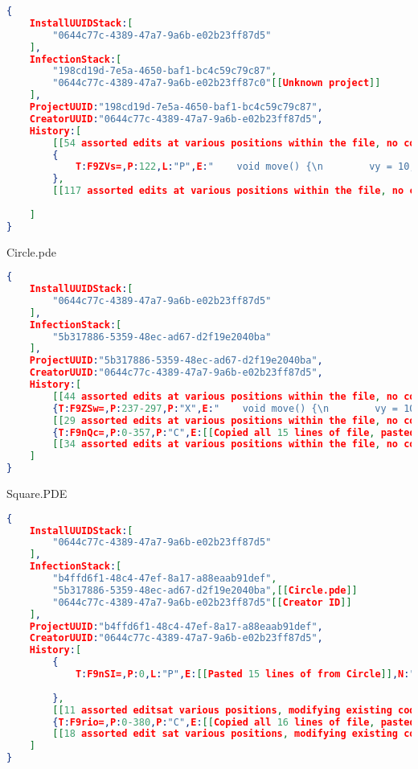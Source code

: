 \documentclass[conference]{IEEEtran}
\newcommand{\n}{\hfill\break}
\begin{document}
\begin{lstlisting}[language=json]
{
	InstallUUIDStack:[
		"0644c77c-4389-47a7-9a6b-e02b23ff87d5"
	],
	InfectionStack:[
		"198cd19d-7e5a-4650-baf1-bc4c59c79c87",
		"0644c77c-4389-47a7-9a6b-e02b23ff87c0"[[Unknown project]]
	],
	ProjectUUID:"198cd19d-7e5a-4650-baf1-bc4c59c79c87",
	CreatorUUID:"0644c77c-4389-47a7-9a6b-e02b23ff87d5",
	History:[
		[[54 assorted edits at various positions within the file, no copies or pastes]]
		{
			T:F9ZVs=,P:122,L:"P",E:"    void move() {\n        vy = 10;\n        y = y + vy;\n    }",N:"Paste too short to track"[[Came from a Cut in Circle]]
		},
		[[117 assorted edits at various positions within the file, no copies or pastes]]
		
	]
}
\end{lstlisting}
Circle.pde
\begin{lstlisting}[language=json]
{
	InstallUUIDStack:[
		"0644c77c-4389-47a7-9a6b-e02b23ff87d5"
	],
	InfectionStack:[
		"5b317886-5359-48ec-ad67-d2f19e2040ba"
	],
	ProjectUUID:"5b317886-5359-48ec-ad67-d2f19e2040ba",
	CreatorUUID:"0644c77c-4389-47a7-9a6b-e02b23ff87d5",
	History:[
		[[44 assorted edits at various positions within the file, no copies or pastes]]
		{T:F9ZSw=,P:237-297,P:"X",E:"    void move() {\n        vy = 10;\n        y = y + vy;\n    }"[[Cut code goes to Shape]]},
		[[29 assorted edits at various positions within the file, no copies or pastes]]
		{T:F9nQc=,P:0-357,P:"C",E:[[Copied all 15 lines of file, pasted into Square]]},
		[[34 assorted edits at various positions within the file, no copies or pastes]]
	]
}
\end{lstlisting}
Square.PDE
\begin{lstlisting}[language=json]
{
	InstallUUIDStack:[
		"0644c77c-4389-47a7-9a6b-e02b23ff87d5"
	],
	InfectionStack:[
		"b4ffd6f1-48c4-47ef-8a17-a88eaab91def",
		"5b317886-5359-48ec-ad67-d2f19e2040ba",[[Circle.pde]]
		"0644c77c-4389-47a7-9a6b-e02b23ff87d5"[[Creator ID]]
	],
	ProjectUUID:"b4ffd6f1-48c4-47ef-8a17-a88eaab91def",
	CreatorUUID:"0644c77c-4389-47a7-9a6b-e02b23ff87d5",
	History:[
		{
			T:F9nSI=,P:0,L:"P",E:[[Pasted 15 lines of from Circle]],N:"paste from project with same creator;Paste from project with UUID 5b317886-5359-48ec-ad67-d2f19e2040ba;"
		
		},
		[[11 assorted editsat various positions, modifying existing code, no copies or pastes]]	
		{T:F9rio=,P:0-380,P:"C",E:[[Copied all 16 lines of file, pasted into Triangle]]},
		[[18 assorted edit sat various positions, modifying existing code, no copies or pastes]]
	]
}
\end{lstlisting}
\end{document}
